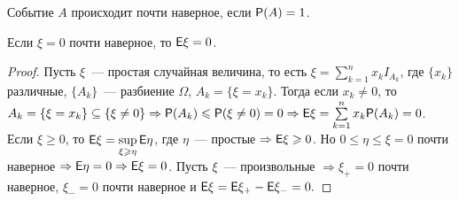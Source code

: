 \begin{definition}
	Событие $A$ происходит почти наверное, если $\P(A) = 1$.
\end{definition}
\begin{property}
	Если $\xi = 0$ почти наверное, то $\E\xi = 0$.
	\begin{proof}
		Пусть $\xi$~--- простая случайная величина, то есть $\xi = \sum\limits_{k = 1}^nx_kI_{A_k}$, где $\{x_k\}$ различные, $\{A_k\}$~--- разбиение $\Omega$, $A_k = \{\xi = x_k\}$. Тогда если $x_k \neq 0$, то $A_k = \{\xi = x_k\} \subseteq \{\xi \neq 0\} \Rightarrow \P(A_k) \leqslant \P(\xi \neq 0) = 0 \Rightarrow \E\xi = \sum\limits_{k = 1}^n x_k\P(A_k) = 0$. Если $\xi \geqslant 0$, то $\E\xi = \sup\limits_{\xi \geqslant \eta} \E\eta$, где $\eta$~--- простые $\Rightarrow \E\xi \geqslant 0$. Но $0 \leqslant \eta \leqslant \xi = 0$ почти наверное $\Rightarrow \E\eta = 0 \Rightarrow \E\xi = 0$. Пусть $\xi$~--- произвольные $\Rightarrow \xi_+ = 0$ почти наверное, $\xi_- = 0$ почти наверное и $\E\xi = \E\xi_+ - \E\xi_- = 0.$
	\end{proof} 
\end{property}